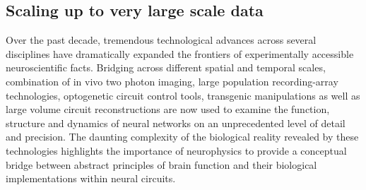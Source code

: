 \documentclass[brainsci, %
               review,submit,pdftex,moreauthors%
               ]{Definitions/mdpi}
\begin{document}

\subsection{Scaling up to very large scale data}
Over the past decade, tremendous technological advances across several disciplines have dramatically expanded the frontiers of experimentally accessible neuroscientific facts. Bridging across different spatial and temporal scales, combination of in vivo two photon imaging, large population recording-array technologies, optogenetic circuit control tools, transgenic manipulations as well as large volume circuit reconstructions are now used to examine the function, structure and dynamics of neural networks on an unprecedented level of detail and precision. The daunting complexity of the biological reality revealed by these technologies highlights the importance of neurophysics to provide a conceptual bridge between abstract principles of brain function and their biological implementations within neural circuits. 
\end{document}
